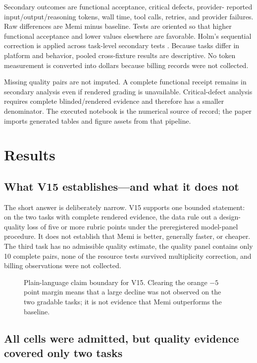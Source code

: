 \documentclass[9pt,twocolumn]{extarticle}
\begin{document}
Secondary outcomes are functional acceptance, critical defects, provider-
reported input/output/reasoning tokens, wall time, tool calls, retries, and
provider failures. Raw differences are Memi minus baseline. Tests are oriented
so that higher functional acceptance and lower values elsewhere are favorable.
Holm's sequential correction is applied across task-level secondary tests
\cite{holm1979}. Because tasks differ in platform and behavior, pooled
cross-fixture results are descriptive. No token measurement is converted into
dollars because billing records were not collected.

Missing quality pairs are not imputed. A complete functional receipt remains
in secondary analysis even if rendered grading is unavailable. Critical-defect
analysis requires complete blinded/rendered evidence and therefore has a
smaller denominator. The executed notebook is the numerical source of record;
the paper imports generated tables and figure assets from that pipeline.

\section{Results}

\subsection{What V15 establishes---and what it does not}

The short answer is deliberately narrow. V15 supports one bounded statement:
on the two tasks with complete rendered evidence, the data rule out a design-
quality loss of five or more rubric points under the preregistered model-panel
procedure. It does not establish that Memi is better, generally faster, or
cheaper. The third task has no admissible quality estimate, the quality panel
contains only 10 complete pairs, none of the resource tests survived
multiplicity correction, and billing observations were not collected.

\begin{figure}[t]
\centering
\ClaimDecisionFigure
\caption{Plain-language claim boundary for V15. Clearing the orange $-5$ point
margin means that a large decline was not observed on the two gradable tasks;
it is not evidence that Memi outperforms the baseline.}\label{fig:claim-decision}
\end{figure}

\subsection{All cells were admitted, but quality evidence covered only two tasks}
\end{document}
